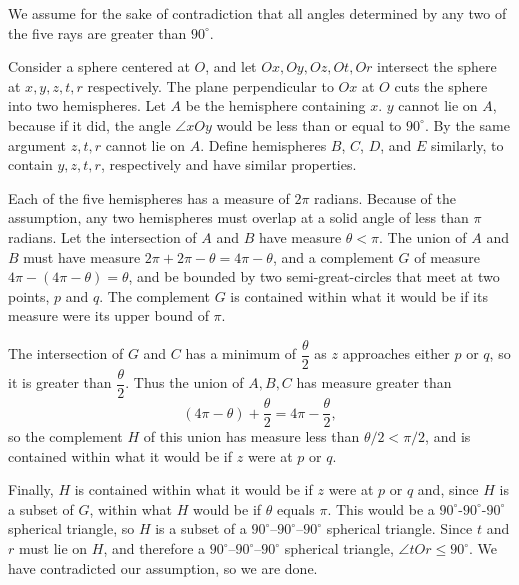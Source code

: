 \documentclass[12pt,a4paper]{memoir}
\theoremstyle{definition}
\begin{document}
\begin{solution}[name={Solution by Mij}] 
	We assume for the sake of contradiction that all angles determined by any two of the five rays are greater than $ 90^\circ$.
	
	Consider a sphere centered at $ O$, and let $ Ox,Oy,Oz,Ot,Or$ intersect the sphere at $ x, y, z, t, r$ respectively.
	The plane perpendicular to $ Ox$ at $ O$ cuts the sphere into two hemispheres.
	Let $ A$ be the hemisphere containing $ x$. $ y$ cannot lie on $ A$, because if it did, the angle $ \angle xOy$ would be less than or equal to $ 90^\circ$.
	By the same argument $ z, t, r$ cannot lie on $ A$. Define hemispheres $ B$, $ C$, $ D$, and $ E$ similarly, to contain $ y, z, t, r$, respectively and have similar properties.
	
	Each of the five hemispheres has a measure of $ 2 \pi$ radians. Because of the assumption, any two hemispheres must overlap at a solid angle of less than $ \pi$ radians. Let the intersection of $ A$ and $ B$ have measure $ \theta < \pi$.
	The union of $ A$ and $ B$ must have measure $ 2\pi + 2\pi - \theta = 4\pi - \theta$, and a complement $ G$ of measure $ 4\pi - (4\pi - \theta) = \theta$, and be bounded by two semi-great-circles that meet at two points, $ p$ and $ q$. The complement $ G$ is contained within what it would be if its measure were its upper bound of $ \pi$.
	
	The intersection of $ G$ and $ C$ has a minimum of $ \dfrac{\theta}{2}$ as $ z$ approaches either $ p$ or $ q$, so it is greater than $ \dfrac{\theta}{2}$. Thus the union of $ A, B, C$ has measure greater than 
	$$ (4\pi - \theta) + \dfrac{\theta}{2} = 4\pi - \dfrac{\theta}{2},$$ so the complement $ H$ of this union has measure less than $\theta/2 < \pi/2$, and is contained within what it would be if $ z$ were at $ p$ or $ q$.
	
	Finally, $ H$ is contained within what it would be if $ z$ were at $ p$ or $ q$ and, since $ H$ is a subset of $ G$, within what $ H$ would be if $ \theta$ equals $ \pi$. This would be a $ 90^\circ$-$ 90^\circ$-$ 90^\circ$ spherical triangle, so $ H$ is a subset of a $ 90^\circ$--$ 90^\circ$--$ 90^\circ$ spherical triangle. Since $ t$ and $ r$ must lie on $ H$, and therefore a $ 90^\circ$--$ 90^\circ$--$ 90^\circ$ spherical triangle, $ \angle tOr \le 90^\circ$. We have contradicted our assumption, so we are done.
\end{solution}
\end{document}
